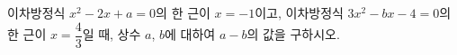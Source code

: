 이차방정식 $x^2-2x+a=0$의 한 근이 $x=-1$이고, 이차방정식 $3x^2-bx-4=0$의 한 근이 $x=\dfrac{4}{3}$일 때, 상수 $a$, $b$에 대하여 $a-b$의 값을 구하시오.
